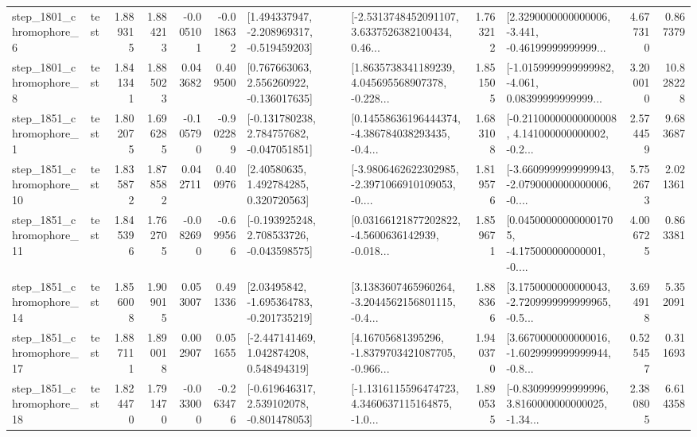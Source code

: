 \begin{tabular}{llrrrrllrlrr}
  step\_1801\_chromophore\_6 &      test &      1.889315 &    1.884213 &     -0.005101 & -0.018632 &   [1.494337947, -2.208969317, -0.519459203] &  [-2.5313748452091107, 3.6337526382100434, 0.46... &       1.763212 &  [2.3290000000000006, -3.441, -0.46199999999999... &            4.677310 &          0.867379 \\
  step\_1801\_chromophore\_8 &      test &      1.841341 &    1.885023 &      0.043682 &  0.409500 &    [0.767663063, 2.556260922, -0.136017635] &  [1.8635738341189239, 4.045695568907378, -0.228... &       1.851505 &  [-1.0159999999999982, -4.061, 0.08399999999999... &            3.200010 &         10.828228 \\
  step\_1851\_chromophore\_1 &      test &      1.802075 &    1.696285 &     -0.105790 & -0.902289 &   [-0.131780238, 2.784757682, -0.047051851] &  [0.14558636196444374, -4.386784038293435, -0.4... &       1.683108 &  [-0.21100000000000008, 4.141000000000002, -0.2... &            2.574459 &          9.683687 \\
 step\_1851\_chromophore\_10 &      test &      1.835872 &    1.878582 &      0.042711 &  0.400976 &      [2.40580635, 1.492784285, 0.320720563] &  [-3.9806462622302985, -2.3971066910109053, -0.... &       1.819576 &  [-3.6609999999999943, -2.0790000000000006, -0.... &            5.752673 &          2.021361 \\
 step\_1851\_chromophore\_11 &      test &      1.845396 &    1.762705 &     -0.082690 & -0.699566 &   [-0.193925248, 2.708533726, -0.043598575] &  [0.03166121877202822, -4.5600636142939, -0.018... &       1.859671 &  [0.045000000000001705, -4.175000000000001, -0.... &            4.006725 &          0.863381 \\
 step\_1851\_chromophore\_14 &      test &      1.856008 &    1.909015 &      0.053007 &  0.491336 &    [2.03495842, -1.695364783, -0.201735219] &  [3.1383607465960264, -3.2044562156801115, -0.4... &       1.888366 &  [3.1750000000000043, -2.7209999999999965, -0.5... &            3.694918 &          5.352091 \\
 step\_1851\_chromophore\_17 &      test &      1.887111 &    1.890018 &      0.002907 &  0.051655 &    [-2.447141469, 1.042874208, 0.548494319] &  [4.16705681395296, -1.8379703421087705, -0.966... &       1.940370 &  [3.6670000000000016, -1.6029999999999944, -0.8... &            0.525457 &          0.311693 \\
 step\_1851\_chromophore\_18 &      test &      1.824470 &    1.791470 &     -0.033000 & -0.263476 &   [-0.619646317, 2.539102078, -0.801478053] &  [-1.1316115596474723, 4.3460637115164875, -1.0... &       1.890535 &  [-0.830999999999996, 3.8160000000000025, -1.34... &            2.380805 &          6.614358 \\

\end{tabular}
